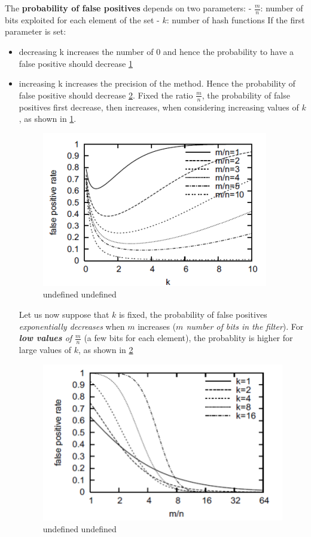 \documentclass[10pt,a4paper]{report}
\begin{document}
The \textbf{probability of false positives} depends on two parameters:
- $\frac{m}{n}$: number of bits exploited for each element of the set
- $k$: number of hash functions
If the first parameter is set:
\begin{itemize}
	\item 
	decreasing k increases the number of 0 and hence the probability to have a false positive should decrease \ref{false-positive}
	\item 
	increasing k increases the precision of the method. Hence the probability of false positive should decrease \ref{false-negative}.
	Fixed the ratio $\frac{m}{n}$, the probability of false positives first decrease, then increases, when considering increasing values of $k$, as shown in \ref{false-positive}.
	\begin{figure}
		\centering
		\includegraphics[scale=0.50]{images/Pasted image 20230317163638.png}
		\caption{undefined undefined}
		\label{false-positive}	
\end{figure}
	
	Let us now suppose that $k$ is fixed, the probability of false positives \textit{exponentially decreases} when $m$ increases (\textit{$m$ number of bits in the filter}).
	For \textit{\textbf{low values} of $\frac{m}{n}$} (a few bits for each element), the probablity is higher for large values of $k$, as shown in \ref{false-negative}
	\begin{figure}
		\centering
		\includegraphics[scale=0.50]{images/Pasted image 20230317163622.png}
		\caption{undefined undefined}
		\label{false-negative}	
\end{figure}
	
\end{itemize}
\end{document}
